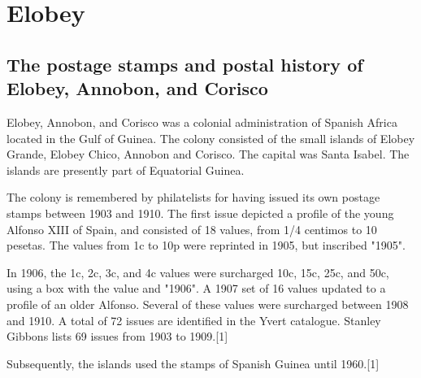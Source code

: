 
\section{Elobey}
\subsection{The postage stamps and postal history of Elobey, Annobon, and Corisco}

Elobey, Annobon, and Corisco was a colonial administration of Spanish Africa located in the Gulf of Guinea. The colony consisted of the small islands of Elobey Grande, Elobey Chico, Annobon and Corisco. The capital was Santa Isabel. The islands are presently part of Equatorial Guinea.


The colony is remembered by philatelists for having issued its own postage stamps between 1903 and 1910. The first issue depicted a profile of the young Alfonso XIII of Spain, and consisted of 18 values, from 1/4 centimos to 10 pesetas. The values from 1c to 10p were reprinted in 1905, but inscribed "1905".

In 1906, the 1c, 2c, 3c, and 4c values were surcharged 10c, 15c, 25c, and 50c, using a box with the value and "1906". A 1907 set of 16 values updated to a profile of an older Alfonso. Several of these values were surcharged between 1908 and 1910. A total of 72 issues are identified in the Yvert catalogue. Stanley Gibbons lists 69 issues from 1903 to 1909.[1]

Subsequently, the islands used the stamps of Spanish Guinea until 1960.[1]




                                           